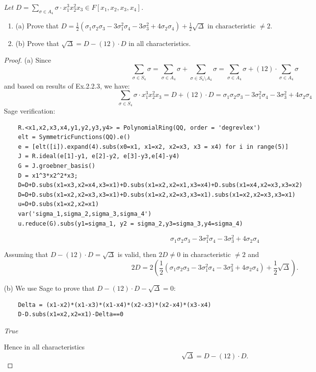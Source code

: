 \documentclass[11pt,a4paper]{article}
\newcommand{\be} {\begin{enumerate}}
\newcommand{\ee} {\end{enumerate}}
\begin{document}
{\it Let $D=\sum_{\sigma \in A_4} \sigma \cdot x_1^3x_2^2x_3 \in F[x_1,x_2,x_3,x_4]$.
\be
\item[(a)] Prove that $D=\frac{1}{2}(\sigma_1\sigma_2\sigma_3 -3 \sigma_1^2 \sigma_4 -3\sigma_3^2 + 4\sigma_2 \sigma_4)+\frac{1}{2}\sqrt{\Delta}$ in characteristic $\ne 2$.
\item[(b)] Prove that $\sqrt{\Delta}=D-(12)\cdot D$ in all characteristics.
\ee
\begin{proof}
\item[(a)] Since $$\sum_{\sigma \in S_4} \sigma =\sum_{\sigma \in A_4} \sigma + \sum_{\sigma \in S_4 \setminus A_4} \sigma =\sum_{\sigma \in A_4} \sigma + (12)\cdot \sum_{\sigma \in  A_4} \sigma $$ and based on results of Ex.2.2.3, we have:
$$\sum_{\sigma \in S_4} \sigma \cdot x_1^3x_2^2x_3 = D+(12)\cdot D =\sigma_1\sigma_2\sigma_3 -3 \sigma_1^2 \sigma_4 -3\sigma_3^2 + 4\sigma_2 \sigma_4 $$
Sage verification:
\begin{verbatim}
    R.<x1,x2,x3,x4,y1,y2,y3,y4> = PolynomialRing(QQ, order = 'degrevlex')
    elt = SymmetricFunctions(QQ).e()
    e = [elt([i]).expand(4).subs(x0=x1, x1=x2, x2=x3, x3 = x4) for i in range(5)]
    J = R.ideal(e[1]-y1, e[2]-y2, e[3]-y3,e[4]-y4)
    G = J.groebner_basis()
    D = x1^3*x2^2*x3;
    D=D+D.subs(x1=x3,x2=x4,x3=x1)+D.subs(x1=x2,x2=x1,x3=x4)+D.subs(x1=x4,x2=x3,x3=x2)
    D=D+D.subs(x1=x2,x2=x3,x3=x1)+D.subs(x1=x2,x2=x3,x3=x1).subs(x1=x2,x2=x3,x3=x1)
    u=D+D.subs(x1=x2,x2=x1)
    var('sigma_1,sigma_2,sigma_3,sigma_4')
    u.reduce(G).subs(y1=sigma_1, y2 = sigma_2,y3=sigma_3,y4=sigma_4)
\end{verbatim}
$$\sigma_1\sigma_2\sigma_3 -3 \sigma_1^2 \sigma_4 -3\sigma_3^2 + 4\sigma_2 \sigma_4 $$

Assuming that $D-(12)\cdot D=\sqrt{\Delta}$ is valid, then $2D \ne 0$ in characteristic $\ne 2$ and
$$2D=2(\frac{1}{2}(\sigma_1\sigma_2\sigma_3 -3 \sigma_1^2 \sigma_4 -3\sigma_3^2 + 4\sigma_2 \sigma_4)+\frac{1}{2}\sqrt{\Delta}).$$
\item[(b)] We use Sage to prove that $D-(12)\cdot D-\sqrt{\Delta}=0$:

\begin{verbatim}
    Delta = (x1-x2)*(x1-x3)*(x1-x4)*(x2-x3)*(x2-x4)*(x3-x4)
    D-D.subs(x1=x2,x2=x1)-Delta==0
\end{verbatim}
\begin{center}
 {\it True}
\end{center}
Hence in all characteristics  $$\sqrt{\Delta}=D-(12)\cdot D.$$
\end{proof}
}
\end{document}
